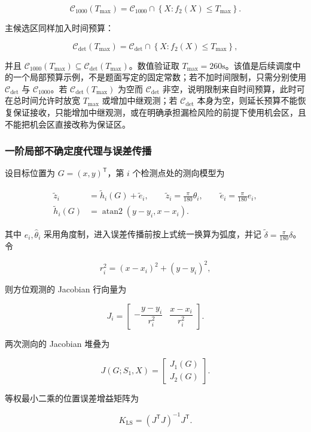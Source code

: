 \[
\mathcal C_{1000}(T_{\max})
=
\mathcal C_{1000}
\cap
\left\{
X:
f_2(X)\le T_{\max}
\right\}.
\]

主候选区同样加入时间预算：

\[
\mathcal C_{\det}(T_{\max})
=
\mathcal C_{\det}
\cap
\left\{
X:
f_2(X)\le T_{\max}
\right\},
\]

并且 $\mathcal C_{1000}(T_{\max})\subseteq\mathcal C_{\det}(T_{\max})$。数值验证取 $T_{\max}=260\mathrm{s}$。该值是后续调度中的一个局部预算示例，不是题面写定的固定常数；若不加时间限制，只需分别使用 $\mathcal C_{\det}$ 与 $\mathcal C_{1000}$。若 $\mathcal C_{\det}(T_{\max})$ 为空而 $\mathcal C_{\det}$ 非空，说明限制来自时间预算，此时可在总时间允许时放宽 $T_{\max}$ 或增加中继观测；若 $\mathcal C_{\det}$ 本身为空，则延长预算不能恢复保证接收，只能增加中继观测，或在明确承担漏检风险的前提下使用机会区，且不能把机会区直接改称为保证区。

\subsubsection{一阶局部不确定度代理与误差传播}

设目标位置为 $G=(x,y)^{\mathsf T}$，第 $i$ 个检测点处的测向模型为

\[
\begin{aligned}
\tilde z_i&=\tilde h_i(G)+\tilde e_i,
\qquad \tilde z_i=\frac{\pi}{180}\hat\theta_i,\qquad
\tilde e_i=\frac{\pi}{180}e_i,\\
\tilde h_i(G)&=\operatorname{atan2}(y-y_i,x-x_i).
\end{aligned}
\]

其中 $e_i,\hat\theta_i$ 采用角度制，进入误差传播前按上式统一换算为弧度，并记 $\tilde\delta=\frac{\pi}{180}\delta$。令

\[
r_i^2=(x-x_i)^2+(y-y_i)^2,
\]

则方位观测的 Jacobian 行向量为

\[
J_i=
\begin{bmatrix}
-\dfrac{y-y_i}{r_i^2} & \dfrac{x-x_i}{r_i^2}
\end{bmatrix}.
\]

两次测向的 Jacobian 堆叠为

\[
J(G;S_1,X)=
\begin{bmatrix}
J_1(G)\\
J_2(G)
\end{bmatrix}.
\]

等权最小二乘的位置误差增益矩阵为

\[
K_{\mathrm{LS}}
=
\left(J^{\mathsf T}J\right)^{-1}J^{\mathsf T}.
\]

